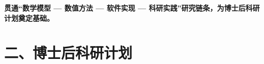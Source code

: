 \documentclass[notheorems]{beamer}
\newcommand{\takeaway}[1]{%
	\begin{center}{\fontsize{9}{13.5}\selectfont\sffamily\bfseries\color{structure.fg}#1}\end{center}}
\begin{document}
\begin{frame}
\begin{columns}[T, totalwidth=\linewidth]
		\end{columns}

		\vspace{1.1em}

		\takeaway{贯通\textbf{“数学模型 — 数值方法 — 软件实现 — 科研实践”}研究链条，为博士后科研计划奠定基础。}

	\end{frame}


	\section{二、博士后科研计划}

\end{document}
